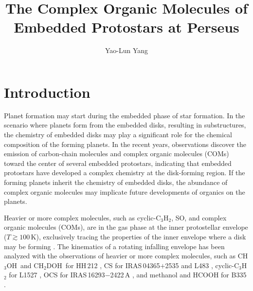 \documentclass[twocolumn]{aastex62}
\newcommand{\methanol}{\mbox{CH$_{3}$OH}}
\newcommand{\dmethanol}{\mbox{CH$_{2}$DOH}}
\begin{document}
\title{The Complex Organic Molecules of Embedded Protostars at Perseus}

\author{Yao-Lun Yang}


\keywords{}

\section{Introduction}


Planet formation may start during the embedded phase of star formation.  In the scenario where planets form from the embedded disks, resulting in substructures, the chemistry of embedded disks may play a significant role for the chemical composition of the forming planets.  In the recent years, observations discover the emission of carbon-chain molecules and complex organic molecules (COMs) toward the center of several embedded protostars, indicating that embedded protostars have developed a complex chemistry at the disk-forming region.  If the forming planets inherit the chemistry of embedded disks, the abundance of complex organic molecules may implicate future developments of organics on the planets. 

Heavier or more complex molecules, such as cyclic-C$_{3}$H$_{2}$, SO, and complex organic molecules (COMs), are in the gas phase at the inner protostellar envelope ($T\gtrsim100$\,K), exclusively tracing the properties of the inner envelope where a disk may be forming \citep{2013ChRv..113.8961A,2014Natur.507...78S}.  The kinematics of a rotating infalling envelope has been analyzed with the observations of heavier or more complex molecules, such as \methanol\ and \dmethanol\ for HH\,212 \citep{2017ApJ...843...27L}, CS for IRAS\,04365$+$2535 \citep{2016ApJ...820L..34S} and L483 \citep{2017ApJ...837..174O}, cyclic-C$_{3}$H$_{2}$ for L1527 \citep{2014Natur.507...78S}, OCS for IRAS\,16293$-$2422\,A \citep{2016ApJ...824...88O}, and methanol and HCOOH for B335 \citep{2019ApJ...873L..21I}.
\end{document}
